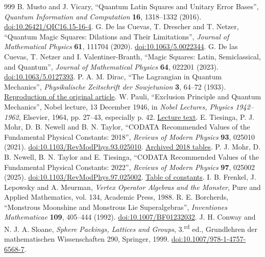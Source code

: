 \begin{thebibliography}{999}
 B. Musto and J. Vicary, ``Quantum Latin Squares and Unitary Error Bases'', \emph{Quantum Information and Computation} \textbf{16}, 1318--1332 (2016). \href{https://doi.org/10.26421/QIC16.15-16-4}{doi:10.26421/QIC16.15-16-4}.
 G. De las Cuevas, T. Drescher and T. Netzer, ``Quantum Magic Squares: Dilations and Their Limitations'', \emph{Journal of Mathematical Physics} \textbf{61}, 111704 (2020). \href{https://doi.org/10.1063/5.0022344}{doi:10.1063/5.0022344}.
 G. De las Cuevas, T. Netzer and I. Valentiner-Branth, ``Magic Squares: Latin, Semiclassical, and Quantum'', \emph{Journal of Mathematical Physics} \textbf{64}, 022201 (2023). \href{https://doi.org/10.1063/5.0127393}{doi:10.1063/5.0127393}.
 P. A. M. Dirac, ``The Lagrangian in Quantum Mechanics'', \emph{Physikalische Zeitschrift der Sowjetunion} \textbf{3}, 64--72 (1933). \href{https://www.informationphilosopher.com/solutions/scientists/dirac/Lagrangian_1933.pdf}{Reproduction of the original article}.
 W. Pauli, ``Exclusion Principle and Quantum Mechanics'', Nobel lecture, 13 December 1946, in \emph{Nobel Lectures, Physics 1942--1962}, Elsevier, 1964, pp. 27--43, especially p. 42. \href{https://www.nobelprize.org/uploads/2018/06/pauli-lecture.pdf}{Lecture text}.
 E. Tiesinga, P. J. Mohr, D. B. Newell and B. N. Taylor, ``CODATA Recommended Values of the Fundamental Physical Constants: 2018'', \emph{Reviews of Modern Physics} \textbf{93}, 025010 (2021). \href{https://doi.org/10.1103/RevModPhys.93.025010}{doi:10.1103/RevModPhys.93.025010}. \href{https://physics.nist.gov/cuu/Constants/ArchiveASCII/allascii_2018.txt}{Archived 2018 tables}.
 P. J. Mohr, D. B. Newell, B. N. Taylor and E. Tiesinga, ``CODATA Recommended Values of the Fundamental Physical Constants: 2022'', \emph{Reviews of Modern Physics} \textbf{97}, 025002 (2025). \href{https://doi.org/10.1103/RevModPhys.97.025002}{doi:10.1103/RevModPhys.97.025002}. \href{https://physics.nist.gov/cuu/Constants/Table/allascii.txt}{Table of constants}.
 I. B. Frenkel, J. Lepowsky and A. Meurman, \emph{Vertex Operator Algebras and the Monster}, Pure and Applied Mathematics, vol. 134, Academic Press, 1988.
 R. E. Borcherds, ``Monstrous Moonshine and Monstrous Lie Superalgebras'', \emph{Inventiones Mathematicae} \textbf{109}, 405--444 (1992). \href{https://doi.org/10.1007/BF01232032}{doi:10.1007/BF01232032}.
 J. H. Conway and N. J. A. Sloane, \emph{Sphere Packings, Lattices and Groups}, 3.\textsuperscript{rd} ed., Grundlehren der mathematischen Wissenschaften 290, Springer, 1999. \href{https://doi.org/10.1007/978-1-4757-6568-7}{doi:10.1007/978-1-4757-6568-7}.

\end{thebibliography}
